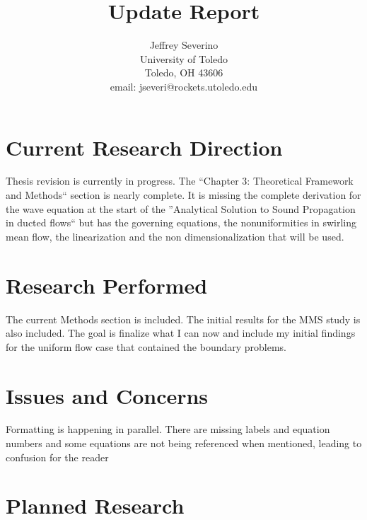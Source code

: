 \documentclass[a4paper]{article}
\begin{document}
\begin{titlepage}

    \title{
    Update Report}


    \author{ Jeffrey Severino \\
        University of Toledo \\
        Toledo, OH  43606 \\
    email: jseveri@rockets.utoledo.edu}


    \maketitle

\end{titlepage}
\section{Current Research Direction}
Thesis revision is currently in progress. The  ``Chapter 3: Theoretical Framework and Methods``
section  is nearly complete. It is missing the 
complete derivation for the wave equation at the start of the ''Analytical 
Solution to Sound Propagation in ducted flows``
but has the governing equations, the nonuniformities in swirling mean flow, the linearization
and the non dimensionalization that will be used.


\section{Research Performed}
The current Methods section is included. The initial results for the MMS
study is also included.  The goal is finalize what I can now and include my initial 
findings for the uniform flow case that contained the boundary problems.

%
%
%
\section{Issues and Concerns}
Formatting is happening in parallel. There are missing labels and equation numbers
and some equations are not being referenced when mentioned, leading to confusion 
for the reader
\section{Planned Research}
\end{document}
